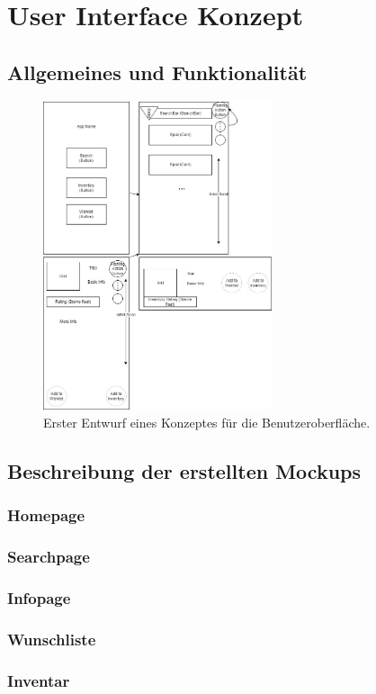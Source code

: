 \chapter{User Interface Konzept}
\section{Allgemeines und Funktionalität}
\begin{figure}[H]
    \centering
    \includegraphics[width=0.6\textwidth]{graphics/konzept.jpeg}
    \caption{Erster Entwurf eines Konzeptes für die Benutzeroberfläche.}
    \label{fig:konzept}
\end{figure}
\section{Beschreibung der erstellten Mockups}
\subsection{Homepage}
\subsection{Searchpage}
\subsection{Infopage}
\subsection{Wunschliste}
\subsection{Inventar}